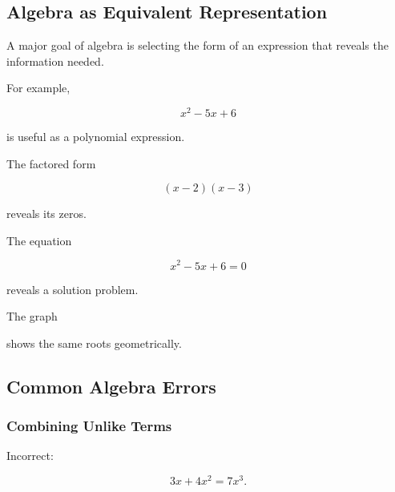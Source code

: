 \subsection{Algebra as Equivalent Representation}
\label{subsec:algebra-equivalent-representation}

A major goal of algebra is selecting the form of an expression that reveals
the information needed.

For example,

\[ x^2-5x+6 \]

is useful as a polynomial expression.

The factored form

\[ (x-2)(x-3) \]

reveals its zeros.

The equation

\[ x^2-5x+6=0 \]

reveals a solution problem.

The graph

\begin{center}
\end{center}

shows the same roots geometrically.

\subsection{Common Algebra Errors}
\label{subsec:common-algebra-errors}

\subsubsection{Combining Unlike Terms}

Incorrect:

\[ 3x+4x^2=7x^3. \]


